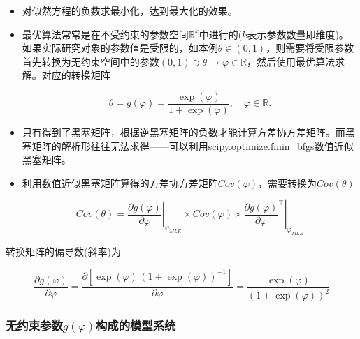 \begin{itemize}
\tightlist
\item
  对似然方程的负数求最小化，达到最大化的效果。
\item
  最优算法常常是在不受约束的参数空间\(\mathbb{R}^{k}\)中进行的(\(k\)表示参数数量即维度)。如果实际研究对象的参数值是受限的，如本例\(\theta \in (0,1)\)，则需要将受限参数首先转换为无约束空间中的参数\((0,1) \ni \theta \rightarrow \varphi \in \mathbb{R}\)，然后使用最优算法求解。对应的转换矩阵

  \begin{equation}
  \theta = g(\varphi) = \frac{\exp(\varphi)}{ 1 + \exp(\varphi)}, \quad \varphi \in \mathbb{R}.
  \end{equation}
\item
  只有得到了黑塞矩阵，根据逆黑塞矩阵的负数才能计算方差协方差矩阵。而黑塞矩阵的解析形往往无法求得------可以利用\href{https://docs.scipy.org/doc/scipy/reference/generated/scipy.optimize.fmin_bfgs.html}{scipy.optimize.fmin\_bfgs}数值近似黑塞矩阵。
\item
  利用数值近似黑塞矩阵算得的方差协方差矩阵\(Cov(\varphi)\)，需要转换为\(Cov(\theta)\)

  \begin{equation}
  Cov(\theta) = \left. \frac{\partial g(\varphi)}{\partial \varphi} \right|_{\varphi_{MLE}} \times Cov(\varphi) \times \left. \frac{\partial g(\varphi)}{\partial \varphi}^{\top} \right|_{\varphi_{MLE}}
  \end{equation}
\end{itemize}

转换矩阵的偏导数(斜率)为

\begin{equation}
\frac{\partial g(\varphi)}{\partial \varphi} = \frac{
\partial \left[ \exp(\varphi) \, \left( 1 + \exp(\varphi) \right)^{-1} \right]
}{\partial \varphi} = \frac{\exp(\varphi)}{\left( 1 + \exp(\varphi) \right)^{2}}
\end{equation}

\subsubsection{\texorpdfstring{无约束参数\(g(\varphi)\)构成的模型系统}{无约束参数g(\textbackslash{}varphi)构成的模型系统}}
\label{sec:ux65e0ux7ea6ux675fux53c2ux6570gvarphiux6784ux6210ux7684ux6a21ux578bux7cfbux7edf}


